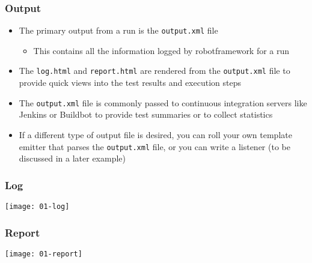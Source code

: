 \documentclass[xcolor=table,handout]{beamer}
\begin{document}
\begin{frame}\frametitle{Output}
    \begin{itemize}
        \item The primary output from a run is the \texttt{output.xml} file
            \begin{itemize}
                \item This contains all the information logged by robotframework for a run
            \end{itemize}
        \item The \texttt{log.html} and \texttt{report.html} are rendered from the \texttt{output.xml} file to provide quick views into the test results and execution steps
        \item The \texttt{output.xml} file is commonly passed to continuous integration servers like Jenkins or Buildbot to provide test summaries or to collect statistics
        \item If a different type of output file is desired, you can roll your own template emitter that parses the \texttt{output.xml} file, or you can write a listener (to be discussed in a later example)
    \end{itemize}
\end{frame}

\begin{frame}\frametitle{Log}
    \begin{center}
        \texttt{[image: 01-log]}
    \end{center}
\end{frame}

\begin{frame}\frametitle{Report}
    \begin{center}
        \texttt{[image: 01-report]}
    \end{center}
\end{frame}
\end{document}
